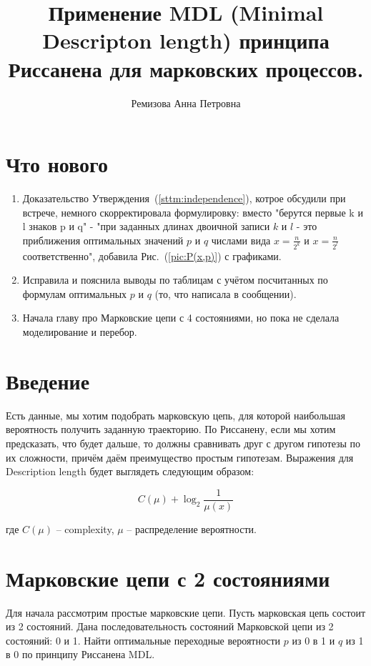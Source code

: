 \documentclass[12pt]{article}
\begin{document}
	\title{Применение MDL (Minimal Descripton length) принципа Риссанена для марковских процессов.}
	\author{Ремизова Анна Петровна}
	\maketitle
	
	\section*{Что нового}
	\begin{enumerate}
		\item Доказательство Утверждения~(\ref{sttm:independence}), котрое обсудили при встрече, немного скорректировала формулировку: вместо "берутся первые k и l знаков p и q" - "при заданных длинах двоичной записи $k$ и $l$ - это приближения оптимальных значений $p$ и $q$ числами вида $x=\frac{n}{2^{k}}$ и $x=\frac{n}{2^{l}}$ соответственно", добавила Рис.~(\ref{pic:P(x,p)}) с графиками.
		\item Исправила и пояснила выводы по таблицам с учётом посчитанных по формулам оптимальных $p$ и $q$ (то, что написала в сообщении).
		\item Начала главу про Марковские цепи с 4 состояниями, но пока не сделала моделирование и перебор.
	\end{enumerate}
	
	\section*{Введение}
	 Есть данные, мы хотим подобрать марковскую цепь, для которой наибольшая вероятность получить заданную траекторию. По Риссанену, если мы хотим предсказать, что будет дальше, то должны сравнивать друг с другом гипотезы по их сложности, причём даём преимущество простым гипотезам. Выражения для Description length будет выглядеть следующим образом:
	
	\begin{equation}C(\mu)+\log_2{\frac{1}{\mu(x)}}\end{equation}
	
	где $C(\mu)$ -- complexity, $\mu$ -- распределение вероятности.
	
	\section*{Марковские цепи с 2 состояниями}
	Для начала рассмотрим простые марковские цепи. Пусть марковская цепь состоит из 2 состояний. Дана последовательность состояний Марковской цепи из 2 состояний: 0 и 1. Найти оптимальные переходные вероятности $p$ из 0 в 1 и $q$ из 1 в 0 по принципу Риссанена MDL. 
	
\end{document}
